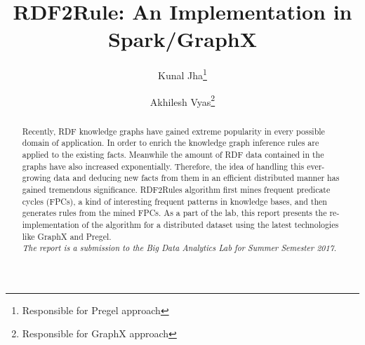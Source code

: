 \documentclass{easychair}
\begin{document}
%
\title{RDF2Rule: An Implementation in Spark/GraphX}



%
\author{
Kunal Jha\thanks{Responsible for Pregel approach}
\and
Akhilesh Vyas\thanks{Responsible for GraphX approach }\\
}




\clearpage

\maketitle

\begin{abstract}
 Recently, RDF knowledge graphs have gained extreme popularity in every possible domain of application. In order to enrich  the knowledge graph inference rules are applied to the existing facts. Meanwhile the amount of RDF data contained in the graphs have also increased exponentially. Therefore, the idea of handling this ever-growing data and deducing new facts from them in an efficient distributed manner has gained tremendous significance. RDF2Rules algorithm first mines frequent predicate cycles (FPCs), a kind of interesting frequent patterns in knowledge bases, and then generates rules from the mined FPCs. As a part of the lab, this report presents the  re-implementation of the algorithm for a distributed dataset using the latest technologies like GraphX and Pregel. \\


 \emph{The report is a submission to the Big Data Analytics Lab for Summer Semester 2017. }
\end{abstract}
\end{document}
